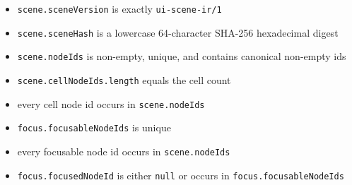 \begin{itemize}
\tightlist
\item
  \texttt{s\allowbreak{}c\allowbreak{}e\allowbreak{}n\allowbreak{}e\allowbreak{}.\allowbreak{}s\allowbreak{}c\allowbreak{}e\allowbreak{}n\allowbreak{}e\allowbreak{}V\allowbreak{}e\allowbreak{}r\allowbreak{}s\allowbreak{}i\allowbreak{}o\allowbreak{}n} is exactly \texttt{u\allowbreak{}i\allowbreak{}-\allowbreak{}s\allowbreak{}c\allowbreak{}e\allowbreak{}n\allowbreak{}e\allowbreak{}-\allowbreak{}i\allowbreak{}r\allowbreak{}/\allowbreak{}1}
\item
  \texttt{s\allowbreak{}c\allowbreak{}e\allowbreak{}n\allowbreak{}e\allowbreak{}.\allowbreak{}s\allowbreak{}c\allowbreak{}e\allowbreak{}n\allowbreak{}e\allowbreak{}H\allowbreak{}a\allowbreak{}s\allowbreak{}h} is a lowercase 64-character SHA-256 hexadecimal digest
\item
  \texttt{s\allowbreak{}c\allowbreak{}e\allowbreak{}n\allowbreak{}e\allowbreak{}.\allowbreak{}n\allowbreak{}o\allowbreak{}d\allowbreak{}e\allowbreak{}I\allowbreak{}d\allowbreak{}s} is non-empty, unique, and contains canonical non-empty ids
\item
  \texttt{s\allowbreak{}c\allowbreak{}e\allowbreak{}n\allowbreak{}e\allowbreak{}.\allowbreak{}c\allowbreak{}e\allowbreak{}l\allowbreak{}l\allowbreak{}N\allowbreak{}o\allowbreak{}d\allowbreak{}e\allowbreak{}I\allowbreak{}d\allowbreak{}s\allowbreak{}.\allowbreak{}l\allowbreak{}e\allowbreak{}n\allowbreak{}g\allowbreak{}t\allowbreak{}h} equals the cell count
\item
  every cell node id occurs in \texttt{s\allowbreak{}c\allowbreak{}e\allowbreak{}n\allowbreak{}e\allowbreak{}.\allowbreak{}n\allowbreak{}o\allowbreak{}d\allowbreak{}e\allowbreak{}I\allowbreak{}d\allowbreak{}s}
\item
  \texttt{f\allowbreak{}o\allowbreak{}c\allowbreak{}u\allowbreak{}s\allowbreak{}.\allowbreak{}f\allowbreak{}o\allowbreak{}c\allowbreak{}u\allowbreak{}s\allowbreak{}a\allowbreak{}b\allowbreak{}l\allowbreak{}e\allowbreak{}N\allowbreak{}o\allowbreak{}d\allowbreak{}e\allowbreak{}I\allowbreak{}d\allowbreak{}s} is unique
\item
  every focusable node id occurs in \texttt{s\allowbreak{}c\allowbreak{}e\allowbreak{}n\allowbreak{}e\allowbreak{}.\allowbreak{}n\allowbreak{}o\allowbreak{}d\allowbreak{}e\allowbreak{}I\allowbreak{}d\allowbreak{}s}
\item
  \texttt{f\allowbreak{}o\allowbreak{}c\allowbreak{}u\allowbreak{}s\allowbreak{}.\allowbreak{}f\allowbreak{}o\allowbreak{}c\allowbreak{}u\allowbreak{}s\allowbreak{}e\allowbreak{}d\allowbreak{}N\allowbreak{}o\allowbreak{}d\allowbreak{}e\allowbreak{}I\allowbreak{}d} is either \texttt{n\allowbreak{}u\allowbreak{}l\allowbreak{}l} or occurs in \texttt{f\allowbreak{}o\allowbreak{}c\allowbreak{}u\allowbreak{}s\allowbreak{}.\allowbreak{}f\allowbreak{}o\allowbreak{}c\allowbreak{}u\allowbreak{}s\allowbreak{}a\allowbreak{}b\allowbreak{}l\allowbreak{}e\allowbreak{}N\allowbreak{}o\allowbreak{}d\allowbreak{}e\allowbreak{}I\allowbreak{}d\allowbreak{}s}
\end{itemize}

